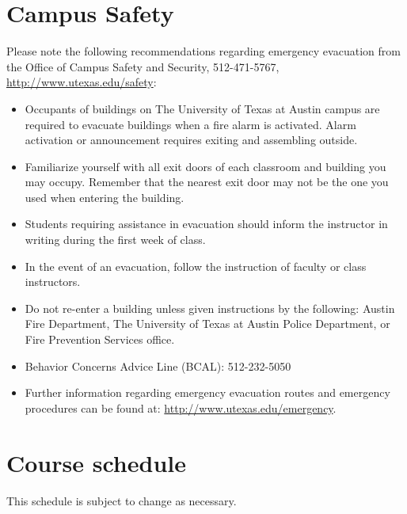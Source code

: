 \documentclass[12pt]{article}
\begin{document}
\section*{Campus Safety}
Please note the following recommendations regarding emergency evacuation from the Office of Campus Safety and Security, 512-471-5767, \url{http://www.utexas.edu/safety}:
\begin{itemize}
\item   Occupants of buildings on The University of Texas at Austin campus are required to evacuate buildings when a fire alarm is activated.  Alarm activation or announcement requires exiting and assembling outside.
\item   Familiarize yourself with all exit doors of each classroom and building you may occupy.  Remember that the nearest exit door may not be the one you used when entering the building.
\item   Students requiring assistance in evacuation should inform the instructor in writing during the first week of class.
\item   In the event of an evacuation, follow the instruction of faculty or class instructors.
\item   Do not re-enter a building unless given instructions by the following: Austin Fire Department, The University of Texas at Austin Police Department, or Fire Prevention Services office.
\item   Behavior Concerns Advice Line (BCAL):  512-232-5050
\item   Further information regarding emergency evacuation routes and emergency procedures can be found at: \url{http://www.utexas.edu/emergency}.
\end{itemize}

\section*{Course schedule}
This schedule is subject to change as necessary.
\end{document}
